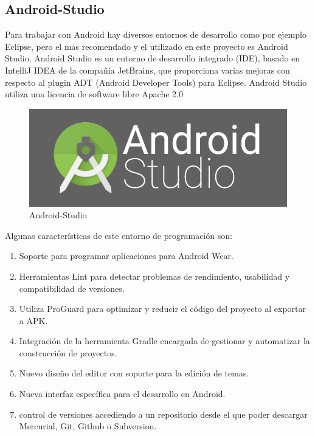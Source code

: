 \documentclass[a4paper,11pt]{book}
\begin{document}
\subsection{Android-Studio}

Para trabajar con Android hay diversos entornos de desarrollo como por ejemplo Eclipse, pero el mas recomendado y el utilizado en este proyecto es Android Studio\cite{as}. Android Studio es un entorno de desarrollo integrado (IDE), basado en IntelliJ IDEA de la compañía JetBrains,  que proporciona varias mejoras con respecto al plugin ADT (Android Developer Tools) para Eclipse. Android Studio utiliza una licencia de software libre Apache 2.0

\begin{figure}[H] 
\centering 
\includegraphics[scale=0.5]{imagenes/desarrollo_herramienta/android.png}
\caption{ Android-Studio}
\end{figure}


Algunas características\cite{as2} de este entorno de programación son:

\begin{enumerate}
\item Soporte para programar aplicaciones para Android Wear.
\item Herramientas Lint para detectar problemas de rendimiento, usabilidad y compatibilidad de versiones.
\item Utiliza ProGuard para optimizar y reducir el código del proyecto al exportar a APK.\item Integración de la herramienta Gradle encargada de gestionar y automatizar la construcción de proyectos.
\item Nuevo diseño del editor con soporte para la edición de temas. 
\item Nueva interfaz específica para el desarrollo en Android.
\item control de versiones accediendo a un repositorio desde el que poder descargar Mercurial, Git, Github o Subversion. 
\end{enumerate}
\end{document}
